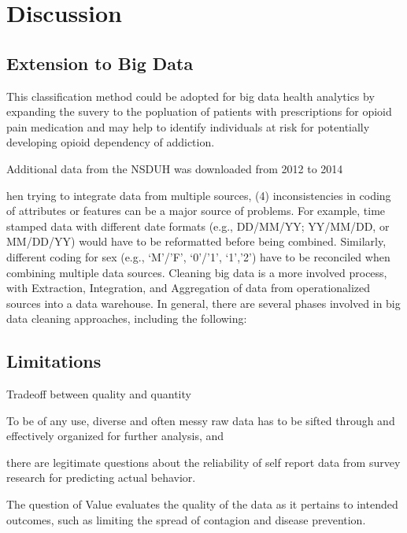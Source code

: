 \documentclass[sigconf]{acmart}
\begin{document}
\cite{vanderplas17}


\section{Discussion}

\subsection{Extension to Big Data}

This classification method could be adopted for big data health analytics by
expanding the suvery to the popluation of patients with prescriptions for 
opioid pain medication and may help to identify individuals at risk for
potentially developing opioid dependency of addiction. 


Additional data from the NSDUH was downloaded from 2012 to 2014

hen trying to integrate data from multiple sources, (4) inconsistencies in coding of attributes or features can be a major source of problems. For example, time stamped data with different date formats (e.g., DD/MM/YY; YY/MM/DD, or MM/DD/YY) would have to be reformatted before being combined. Similarly, different coding for sex (e.g., ‘M’/’F’, ‘0’/’1’, ‘1’,’2’) have to be reconciled when combining multiple data sources. Cleaning big data is a more involved process, with Extraction, Integration, and Aggregation of data from operationalized sources into a data warehouse. In general, there are several phases involved in big data cleaning approaches, including the following:

\subsection{Limitations}

Tradeoff between quality and quantity


To be of any use, diverse and often messy raw data has to be sifted through and 
effectively organized for further analysis, and 


there are legitimate questions about the reliability of self report data from survey
research for predicting actual behavior. 

The question of 
Value evaluates the quality of the data as it pertains to intended outcomes, such 
as limiting the spread of contagion and disease prevention. 
\end{document}

